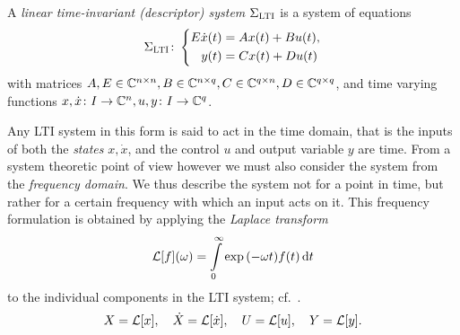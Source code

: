 \begin{definition}\label{def:lti}
    A \emph{linear time-invariant (descriptor) system} $\Sigma_{\textsc{LTI}}$ is a system of equations
    \begin{equation}\label{eq:lti}
        \Sigma_{\textsc{LTI}} \colon \left\lbrace
        \begin{aligned}
            E \dot{x}(t) &= A x(t) + B u(t), \\
            y(t) &= C x(t) + D u(t)
        \end{aligned}
        \right.
    \end{equation}
    with matrices $A, E \in \mathbb{C}^{n \times n}, B \in \mathbb{C}^{n \times q}, C \in \mathbb{C}^{q \times n}, D \in \mathbb{C}^{q \times q}$, and time varying functions $x, \dot{x} \colon I \to \mathbb{C}^n, u, y \colon I \to \mathbb{C}^q$.
\end{definition}

Any LTI system in this form is said to act in the time domain, that is the inputs of both the \emph{states} $x, \dot{x}$, and the control $u$ and output variable $y$ are time.
From a system theoretic point of view however we must also consider the system from the \emph{frequency domain}.
We thus describe the system not for a point in time, but rather for a certain frequency with which an input acts on it.
This frequency formulation is obtained by applying the \emph{Laplace transform}
\begin{equation*}\label{eq:laplace-trafo}
    \mathcal{L}[f](\omega) = \int\limits_0^\infty \exp{(- \omega t)} f(t) \mathop{}\!\mathrm{d} t
\end{equation*}
to the individual components in the LTI system; cf.~\cite{Arendt2011}.
\begin{equation}
    X = \mathcal{L}[x],\quad \dot{X} = \mathcal{L}[\dot{x}],\quad U = \mathcal{L}[u],\quad Y = \mathcal{L}[y].
\end{equation}

